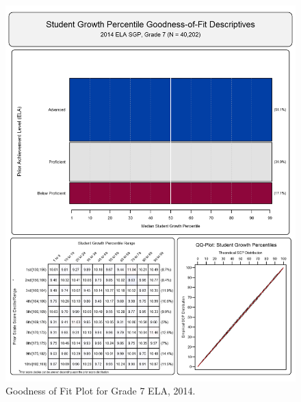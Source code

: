 \documentclass[12pt]{article}
\begin{document}
\begin{figure}[htbp]
\centering
\includegraphics{../img/Goodness_of_Fit/ELA.2014/2014_ELA_7;2013_ELA_6;2012_ELA_5;2011_ELA_4;2010_ELA_3.png}
\caption{Goodness of Fit Plot for Grade 7 ELA, 2014.}
\end{figure}
\end{document}
